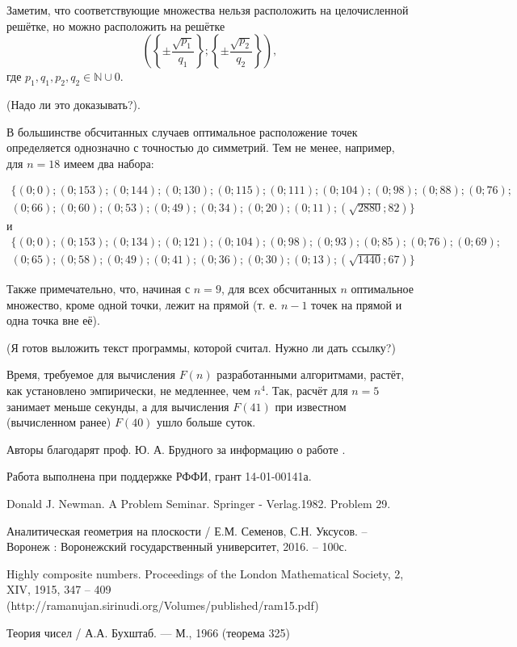 \documentclass[a4paper,14pt]{article} %
\begin{document}
Заметим, что соответствующие множества нельзя расположить на целочисленной решётке, но можно расположить на решётке 
$$
	\left(
		\left\{\pm\frac{\sqrt{p_1}}{q_1}\right\};
		\left\{\pm\frac{\sqrt{p_2}}{q_2}\right\}
	\right),$$
где $p_1,q_1,p_2,q_2 \in \mathbb{N} \cup{0}$.

(Надо ли это доказывать?).

В большинстве обсчитанных случаев оптимальное расположение точек определяется однозначно с точностью до симметрий.
Тем не менее, например, для $n=18$ имеем два набора:

\begin{multline*}
\{( 0 ; 0 ); ( 0 ; 153 ); ( 0 ; 144 ); ( 0 ; 130 ); ( 0 ; 115 ); ( 0 ; 111 ); ( 0 ; 104 ); ( 0 ; 98 ); ( 0 ; 88 ); ( 0 ; 76 );\\
( 0 ; 66 ); ( 0 ; 60 ); ( 0 ; 53 ); ( 0 ; 49 ); ( 0 ; 34 ); ( 0 ; 20 ); ( 0 ; 11 ); ( \sqrt{2880} ; 82 )\}
\end{multline*}
и
\begin{multline*}
\{( 0 ; 0 ); ( 0 ; 153 ); ( 0 ; 134 ); ( 0 ; 121 ); ( 0 ; 104 ); ( 0 ; 98 ); ( 0 ; 93 ); ( 0 ; 85 ); ( 0 ; 76 ); ( 0 ; 69 );\\
( 0 ; 65 ); ( 0 ; 58 ); ( 0 ; 49 ); ( 0 ; 41 ); ( 0 ; 36 ); ( 0 ; 30 ); ( 0 ; 13 ); ( \sqrt{1440} ; 67 )\}
\end{multline*}


Также примечательно, что, начиная с $n=9$, для всех обсчитанных $n$ оптимальное множество, кроме одной точки, лежит на прямой (т. е. $n-1$ точек на прямой и одна точка вне её).

(Я готов выложить текст программы, которой считал. Нужно ли дать ссылку?)

Время, требуемое для вычисления $F(n)$ разработанными алгоритмами, растёт, как установлено эмпирически, не медленнее, чем $n^4$.
Так, расчёт для $n=5$ занимает меньше секунды, а для вычисления $F(41)$ при известном (вычисленном ранее) $F(40)$ ушло больше суток.

Авторы благодарят проф. Ю. А. Брудного за информацию о работе \cite{Newman}.

Работа выполнена при поддержке РФФИ, грант 14-01-00141а.


\begin{thebibliography}{99}

 Donald J. Newman. A Problem Seminar. Springer - Verlag.1982. Problem 29.

 Аналитическая геометрия на плоскости / Е.М. Семенов, С.Н. Уксусов. – Воронеж : Воронежский государственный университет, 2016. – 100с.

 Highly composite numbers. Proceedings of the London Mathematical Society, 2, XIV, 1915, 347 – 409 (http://ramanujan.sirinudi.org/Volumes/published/ram15.pdf)

 Теория чисел / А.А. Бухштаб. --- М., 1966 (теорема 325)


\end{thebibliography}
\end{document}
